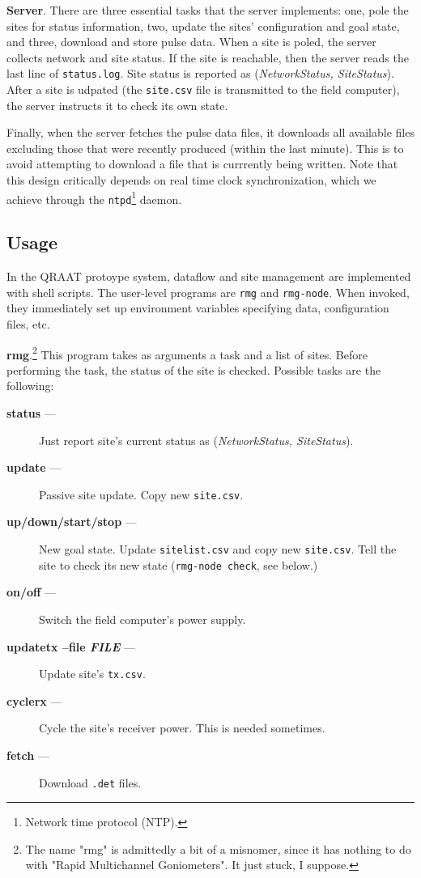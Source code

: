 \documentclass[letter]{article}
\newcounter{foot}
\begin{document}
\textbf{Server}. There are three essential tasks that the server implements: one, pole the 
sites for status information, two, update the sites' configuration and goal state, and three,
download and store pulse data. When a site is poled, the server collects network and site status. 
If the site is reachable, then the server reads the last line of \texttt{status.log}. Site status
is reported as (\textit{NetworkStatus, SiteStatus}). After a site is udpated (the \texttt{site.csv} 
file is transmitted to the field computer), the server instructs it to check its own state. 
   
Finally, when the server fetches the pulse data files, it downloads all available files excluding 
those that were recently produced (within the last minute). This is to avoid attempting to download 
a file that is currrently being written. Note that this design critically depends on real time clock
synchronization, which we achieve through the \texttt{ntpd}\footnote{Network time protocol (NTP).}
daemon. 

\subsection{Usage}
In the QRAAT protoype system, dataflow and site management are implemented with shell scripts. The
user-level programs are \texttt{rmg} and \texttt{rmg-node}. When invoked, they immediately 
set up environment variables specifying data, configuration files, etc. 

\textbf{rmg}.\footnote{The name "rmg" is admittedly a bit of a misnomer, since it 
has nothing to do with "Rapid Multichannel Goniometers". It just stuck, I suppose.} This program
takes as arguments a task and a list of sites. Before performing the task, the status of the site
is checked. Possible tasks are the following: 
\begin{description}
  \item[\quad \textbf{status} ---] Just report site's current status as (\textit{NetworkStatus, SiteStatus}).
  \item[\quad \textbf{update} ---] Passive site update. Copy new \texttt{site.csv}. 
  \item[\quad \textbf{up/down/start/stop} ---] New goal state. Update \texttt{sitelist.csv} and copy new 
    \texttt{site.csv}. Tell the site to check its new state (\texttt{rmg-node check}, see below.) 
  \item[\quad \textbf{on/off} ---] Switch the field computer's power supply. 
  \item[\quad \textbf{updatetx --file \textit{FILE}} ---] Update site's \texttt{tx.csv}.
  \item[\quad \textbf{cyclerx} ---] Cycle the site's receiver power. This is needed sometimes. 
  \item[\quad \textbf{fetch} ---] Download \texttt{.det} files.  
\end{description}
\end{document}
